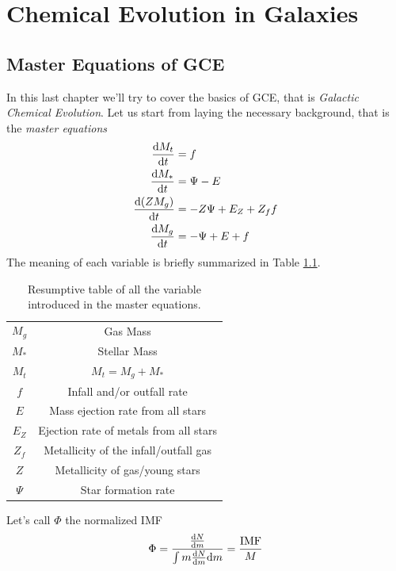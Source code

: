\chapter{Chemical Evolution in Galaxies} \label{ch:ix}

\section{Master Equations of GCE}

In this last chapter we'll try to cover the basics of GCE, that is \emph{Galactic Chemical Evolution}. Let us start from laying the necessary background, that is the \emph{master equations}
\begin{align}
    \frac{\text{d}M_{t}}{\text{d}t} &= f\\
    \frac{\text{d}M_{*}}{\text{d}t} &= \Psi - E\\
    \frac{\text{d}(ZM_{g})}{\text{d}t} &= -Z\Psi + E_{Z}+Z_{f}f\\
    \frac{\text{d}M_{g}}{\text{d}t} &= -\Psi + E +f
\end{align}
The meaning of each variable is briefly summarized in Table \ref{tbl:lottavariables}.
\begin{table}[h!]
    \centering 
    \begin{tabular}{c|c}
        $M_{g}$ & Gas Mass \\
        $M_{*}$ & Stellar Mass\\
        $M_{t}$ & $M_{t} = M_{g}+M_{*}$\\
        $f$ & Infall and/or outfall rate\\
        $E$ & Mass ejection rate from all stars\\
        $E_{Z}$ & Ejection rate of metals from all stars\\
        $Z_{f}$ & Metallicity of the infall/outfall gas\\
        $Z$ & Metallicity of gas/young stars\\
        $\Psi$ & Star formation rate\\
    \end{tabular}
    \vspace{5pt}
    \caption{Resumptive table of all the variable introduced in the master equations.}
    \label{tbl:lottavariables}
\end{table}
\par Let's call $\Phi$ the normalized IMF
\begin{equation}
    \Phi = \frac{\frac{\text{d}N}{\text{d}m}}{\int m\frac{\text{d}N}{\text{d}m}\text{d}m} = \frac{\text{IMF}}{M}
    \label{eq:normalized_IMF}
\end{equation}
